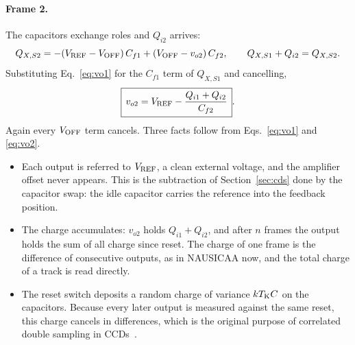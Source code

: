 \documentclass[11pt,a4paper]{article}
\newcommand{\Vref}{V_{\rm REF}}
\newcommand{\Voff}{V_{\rm OFF}}
\begin{document}
%
\paragraph{Frame 2.} The capacitors exchange roles and $Q_{i2}$ arrives:
%
\begin{equation}
 Q_{X,S2} = -(\Vref-\Voff)\,C_{f1} + (\Voff-v_{o2})\,C_{f2},
 \qquad Q_{X,S1}+Q_{i2}=Q_{X,S2}.
\end{equation}
%
Substituting Eq.~\eqref{eq:vo1} for the $C_{f1}$ term of $Q_{X,S1}$ and
cancelling,
%
\begin{equation}
 \boxed{\,v_{o2} = \Vref - \frac{Q_{i1}+Q_{i2}}{C_{f2}}\,}.
\label{eq:vo2}
\end{equation}
%
Again every $\Voff$ term cancels. Three facts follow from
Eqs.~\eqref{eq:vo1} and \eqref{eq:vo2}.
%
\begin{itemize}
\item Each output is referred to $\Vref$, a clean external voltage, and the
  amplifier offset never appears. This is the subtraction of
  Section~\ref{sec:cds} done by the capacitor swap: the idle capacitor
  carries the reference into the feedback position.
\item The charge accumulates: $v_{o2}$ holds $Q_{i1}+Q_{i2}$, and after $n$
  frames the output holds the sum of all charge since reset. The charge of
  one frame is the difference of consecutive outputs, as in NAUSICAA now, and
  the total charge of a track is read directly.
\item The reset switch deposits a random charge of variance $kT_{\rm K}C$ on
  the capacitors. Because every later output is measured against the same
  reset, this charge cancels in differences, which is the original purpose of
  correlated double sampling in CCDs~\cite{Janesick2001}.
\end{itemize}

\end{document}

